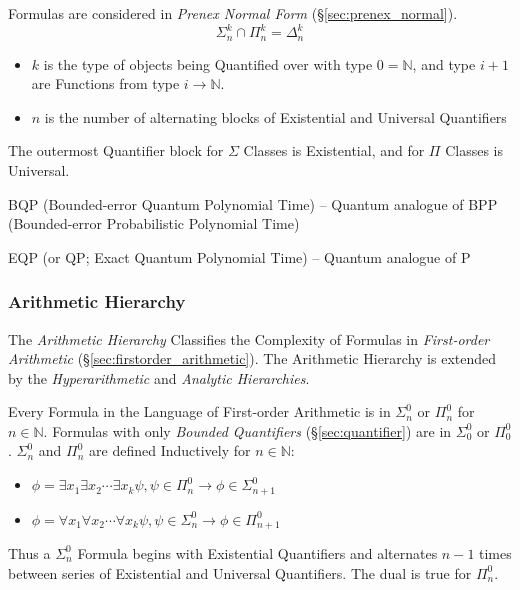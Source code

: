 Formulas are considered in \emph{Prenex Normal Form}
(\S\ref{sec:prenex_normal}).
\[
  \Sigma^k_n \cap \Pi^k_n = \Delta^k_n
\]
\begin{itemize}
  \item $k$ is the type of objects being Quantified over with type
    $0 = \mathbb{N}$, and type $i + 1$ are Functions from type $i
    \rightarrow \mathbb{N}$.
  \item $n$ is the number of alternating blocks of Existential and
    Universal Quantifiers
\end{itemize}
The outermost Quantifier block for $\Sigma$ Classes is Existential,
and for $\Pi$ Classes is Universal.

BQP (Bounded-error Quantum Polynomial Time) -- Quantum analogue of
BPP (Bounded-error Probabilistic Polynomial Time)

EQP (or QP; Exact Quantum Polynomial Time) -- Quantum analogue of P



\subsubsection{Arithmetic Hierarchy}\label{sec:arithmetic_hierarchy}

The \emph{Arithmetic Hierarchy} Classifies the Complexity of Formulas
in \emph{First-order Arithmetic}
(\S\ref{sec:firstorder_arithmetic}). The Arithmetic Hierarchy is
extended by the \emph{Hyperarithmetic} and \emph{Analytic
  Hierarchies}.

Every Formula in the Language of First-order Arithmetic is in
$\Sigma^0_n$ or $\Pi^0_n$ for $n \in \mathbb{N}$. Formulas with only
\emph{Bounded Quantifiers} (\S\ref{sec:quantifier}) are in
$\Sigma^0_0$ or $\Pi^0_0$. $\Sigma^0_n$ and $\Pi^0_n$ are defined
Inductively for $n \in \mathbb{N}$:

\begin{itemize}
  \item $\phi = \exists x_1 \exists x_2 \cdots \exists x_k\psi, \psi
    \in \Pi^0_n \rightarrow \phi \in \Sigma^0_{n+1}$
  \item $\phi = \forall x_1 \forall x_2 \cdots \forall x_k\psi, \psi
    \in \Sigma^0_n \rightarrow \phi \in \Pi^0_{n+1}$
\end{itemize}

Thus a $\Sigma^0_n$ Formula begins with Existential Quantifiers and
alternates $n-1$ times between series of Existential and Universal
Quantifiers. The dual is true for $\Pi^0_n$.

